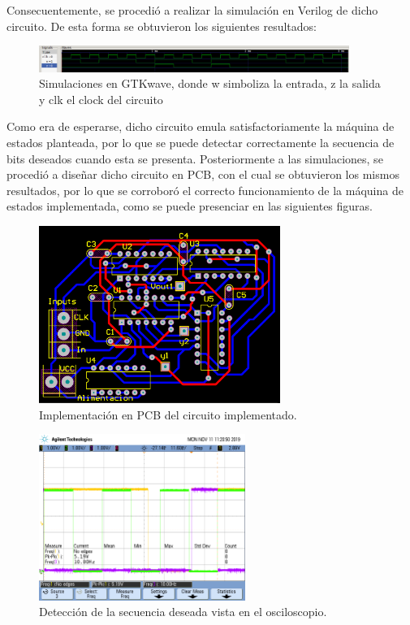 Consecuentemente, se procedió a realizar la simulación en Verilog de dicho circuito. De esta forma se obtuvieron los siguientes resultados:
\begin{figure}[H]
\centering
\includegraphics[width=0.9\textwidth]{ImagenesEjercicio2/simulacion.png}
\caption{Simulaciones en GTKwave, donde w simboliza la entrada, z la salida y clk el clock del circuito}
\end{figure}

Como era de esperarse, dicho circuito emula satisfactoriamente la máquina de estados planteada, por lo que se puede detectar correctamente la secuencia de bits deseados cuando esta se presenta. Posteriormente a las simulaciones, se procedió a diseñar dicho circuito en PCB, con el cual se obtuvieron los mismos resultados, por lo que se corroboró el correcto funcionamiento de la máquina de estados implementada, como se puede presenciar en las siguientes figuras.
\begin{figure}[H]
\centering
\includegraphics[width=0.7\textwidth]{ImagenesEjercicio2/pcb.png}
\caption{Implementación en PCB del circuito implementado.}
\end{figure}

\begin{figure}[H]
\centering
\includegraphics[width=0.6\textwidth,trim={0 2.2cm 0.1cm 1.75cm},clip]{ImagenesEjercicio2/scope_0.png}
\caption{Detección de la secuencia deseada vista en el osciloscopio.}
\end{figure}
